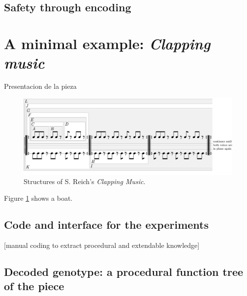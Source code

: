 \documentclass{article}
\begin{document}
\subsection{Safety through encoding}









\section{A minimal example: \textsl{Clapping music}}

Presentacion de la pieza


\begin{figure}
  \includegraphics[width=\linewidth]{figs/clapping_patterns.pdf}
  \caption{Structures of S. Reich's \emph{Clapping Music}.}
  \label{fig:boat1}
\end{figure}

Figure \ref{fig:boat1} shows a boat.

\subsection{Code and interface for the experiments}
[manual coding to extract procedural and extendable knowledge]\cite{Hofmann2015} 

\subsection{Decoded genotype: a procedural function tree of the piece}
\end{document}
